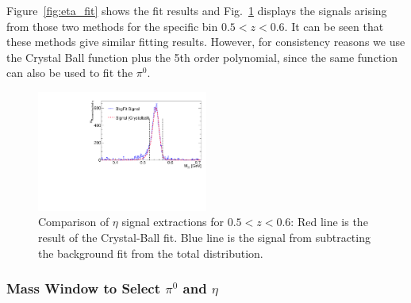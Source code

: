 Figure~\ref{fig:eta_fit} shows the fit results and Fig.~\ref{fig:etasignal} displays the signals arising from those two methods for the specific bin $0.5 < z < 0.6$. It can be seen that these methods give similar fitting results. However, for consistency reasons we use the Crystal Ball function plus the 5th order polynomial, since the same function can also be used to fit the $\pi^0$.

\begin{figure}
\centering
\includegraphics[width=0.5\textwidth,natwidth=610,natheight=642]{figure_dataselection/eta_Signal_Z_4.pdf}
\caption[Comparison of $\eta$ signal extractions]{Comparison of $\eta$ signal extractions for $0.5<z<0.6$: Red line is the result of the Crystal-Ball fit. Blue line is the signal from subtracting the background fit from the total distribution.}
\label{fig:etasignal}
\end{figure}

\subsubsection{\texorpdfstring{Mass Window to Select $\pi^0$ and $\eta$}{Mass Window to Select pi0 and eta}}
\label{sec:masswindow}

